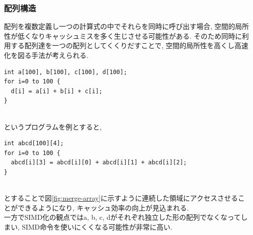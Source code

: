 \subsubsection{配列構造}
\label{subsubsec:soa}
配列を複数定義し一つの計算式の中でそれらを同時に呼び出す場合, 空間的局所性が低くなりキャッシュミスを多く生じさせる可能性がある.
そのため同時に利用する配列達を一つの配列としてくくりだすことで, 空間的局所性を高くし高速化を図る手法が考えられる.\\
\begin{table}[htb]
{\footnotesize
\begin{framed}
\begin{verbatim}
int a[100], b[100], c[100], d[100];
for i=0 to 100 {
  d[i] = a[i] + b[i] + c[i];
}
\end{verbatim}
\end{framed}
}
\end{table}
\\
というプログラムを例とすると,\\
\begin{table}[htb]
{\footnotesize
\begin{framed}
\begin{verbatim}
int abcd[100][4];
for i=0 to 100 {
  abcd[i][3] = abcd[i][0] + abcd[i][1] + abcd[i][2];
}
\end{verbatim}
\end{framed}
}
\end{table}
\\
とすることで図\ref{fig:merge-array}に示すように連続した領域にアクセスさせることができるようになり, キャッシュ効率の向上が見込まれる.\\
一方でSIMD化の観点ではa, b, c, dがそれぞれ独立した形の配列でなくなってしまい,
SIMD命令を使いにくくなる可能性が非常に高い.\\

